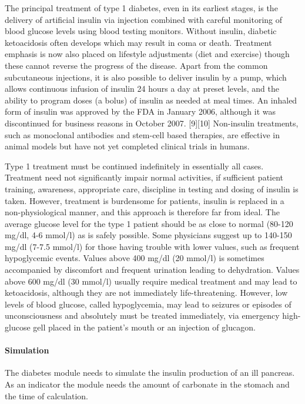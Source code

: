 The principal treatment of type 1 diabetes, even in its earliest stages, is the delivery of artificial insulin via injection combined with careful monitoring of blood glucose levels using blood testing monitors. 
Without insulin, diabetic ketoacidosis often develops which may result in coma or death. Treatment emphasis is now also placed on lifestyle adjustments (diet and exercise) though these cannot reverse the progress of the disease. 
Apart from the common subcutaneous injections, it is also possible to deliver insulin by a pump, which allows continuous infusion of insulin 24 hours a day at preset levels, and the ability to program doses (a bolus) of insulin as needed at meal times. 
An inhaled form of insulin was approved by the FDA in January 2006, although it was discontinued for business reasons in October 2007. [9][10] Non-insulin treatments, such as monoclonal antibodies and stem-cell based therapies, 
are effective in animal models but have not yet completed clinical trials in humans.

Type 1 treatment must be continued indefinitely in essentially all cases. Treatment need not significantly impair normal activities, if sufficient patient training, awareness, appropriate care, discipline in testing and dosing of insulin is taken. 
However, treatment is burdensome for patients, insulin is replaced in a
non-physiological manner, and this approach is therefore far from ideal. The
average glucose level for the type 1 patient should be as close to normal
(80-120 mg/dl, 4-6 mmol/l) as is safely possible. Some physicians suggest up to
140-150 mg/dl (7-7.5 mmol/l) for those having trouble with lower values, such
as frequent hypoglycemic events. Values above 400 mg/dl (20 mmol/l) is
sometimes accompanied by discomfort and frequent urination leading to
dehydration. Values above 600 mg/dl (30 mmol/l) usually require medical
treatment and may lead to ketoacidosis, although they are not immediately
life-threatening. However, low levels of blood glucose, called hypoglycemia,
may lead to seizures or episodes of unconsciousness and absolutely must be
treated immediately, via emergency high-glucose gell placed in the patient's
mouth or an injection of glucagon.

\paragraph{Simulation}
The diabetes module needs to simulate the insulin production of an ill pancreas. 
As an indicator the module needs the amount of carbonate in the stomach and the time of calculation.

